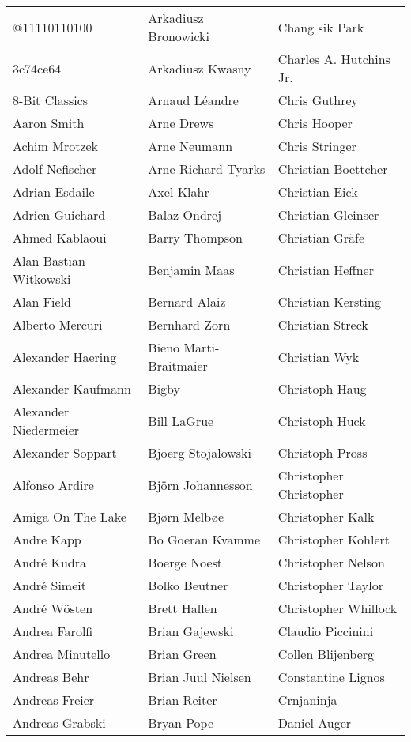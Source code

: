 \setlength{\tabcolsep}{1mm}
\begin{tabular}{p{4.5cm}p{4.5cm}p{4.5cm}}
@11110110100 & Arkadiusz Bronowicki & Chang sik Park \\
3c74ce64 & Arkadiusz Kwasny & Charles A. Hutchins Jr. \\
8-Bit Classics & Arnaud Léandre & Chris Guthrey \\
Aaron Smith & Arne Drews & Chris Hooper \\
Achim Mrotzek & Arne Neumann & Chris Stringer \\
Adolf Nefischer & Arne Richard Tyarks & Christian Boettcher \\
Adrian Esdaile & Axel Klahr & Christian Eick \\
Adrien Guichard & Balaz Ondrej & Christian Gleinser \\
Ahmed Kablaoui & Barry Thompson & Christian Gräfe \\
Alan Bastian Witkowski & Benjamin Maas & Christian Heffner \\
Alan Field & Bernard Alaiz & Christian Kersting \\
Alberto Mercuri & Bernhard Zorn & Christian Streck \\
Alexander Haering & Bieno Marti-Braitmaier & Christian Wyk \\
Alexander Kaufmann & Bigby & Christoph Haug \\
Alexander Niedermeier & Bill LaGrue & Christoph Huck \\
Alexander Soppart & Bjoerg Stojalowski & Christoph Pross \\
Alfonso Ardire & Björn Johannesson & Christopher Christopher \\
Amiga On The Lake & Bjørn Melbøe & Christopher Kalk \\
Andre Kapp & Bo Goeran Kvamme & Christopher Kohlert \\
André Kudra & Boerge Noest & Christopher Nelson \\
André Simeit & Bolko Beutner & Christopher Taylor \\
André Wösten & Brett Hallen & Christopher Whillock \\
Andrea Farolfi & Brian Gajewski & Claudio Piccinini \\
Andrea Minutello & Brian Green & Collen Blijenberg \\
Andreas Behr & Brian Juul Nielsen & Constantine Lignos \\
Andreas Freier & Brian Reiter & Crnjaninja \\
Andreas Grabski & Bryan Pope & Daniel Auger \\

\end{tabular}
